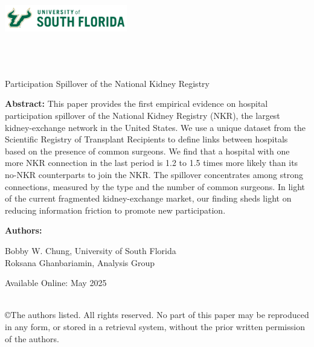 \documentclass[11pt]{article}
\begin{document}
\onehalfspacing

\noindent \includegraphics[width = 0.4\textwidth]{USouthFlorida-lightbg-2c-rgb-h.png} \\

\noindent{\color{usfgreen} \rule{0.5\textwidth}{10pt}}{\color{usfgold} \rule{0.5\textwidth}{10pt}}\\

 \\
 \\

\vspace*{0.5in}

\begin{center} 
    \huge Participation Spillover of the National Kidney Registry
\end{center}

\vspace*{0.5in}

\noindent \textbf{Abstract:} This paper provides the first empirical evidence on hospital participation spillover of the National Kidney Registry (NKR), the largest kidney-exchange network in the United States. We use a unique dataset from the Scientific Registry of Transplant Recipients to define links between hospitals based on the presence of common surgeons. We find that a hospital with one more NKR connection in the last period is 1.2 to 1.5 times more likely than its no-NKR counterparts to join the NKR. The spillover concentrates among strong connections, measured by the type and the number of common surgeons. In light of the current fragmented kidney-exchange market, our finding sheds light on reducing information friction to promote new participation.

\vspace*{0.25in}

\noindent \textbf{Authors:}

Bobby W. Chung, University of South Florida \\
\indent Roksana Ghanbariamin, Analysis Group

\vspace*{0.25in}


\noindent Available Online: May 2025 %

\vfill 
\noindent{\color{usfgreen} \rule{\textwidth}{5pt}}\\
\noindent \small ©The authors listed. All rights reserved. No part of this paper may be reproduced in any form, or stored in a retrieval system, without the prior written permission of the authors.
\thispagestyle{empty}
\end{document}
